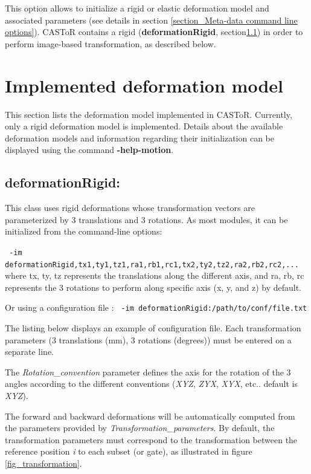 \documentclass[a4paper, 11pt]{article}
\begin{document}
This option allows to initialize a rigid or elastic deformation model and associated parameters (see details in section \ref{section_Meta-data command line options}). CASToR contains a rigid (\textbf{deformationRigid}, section\ref{ss_rigid}) in order to perform image-based transformation, as described below. 


\clearpage
\section{Implemented deformation model}
\label{s_implemented_model}

This section lists the deformation model implemented in CASToR. Currently, only a rigid deformation model is implemented. Details about the available deformation models and information regarding their initialization can be displayed using the command  \textbf{-help-motion}. 

\subsection{deformationRigid:}
\label{ss_rigid}

This class uses rigid deformations whose transformation vectors are parameterized by 3 translations and 3 rotations. As most modules, it can be initialized from the command-line options: 

\bigskip
\verb| -im deformationRigid,tx1,ty1,tz1,ra1,rb1,rc1,tx2,ty2,tz2,ra2,rb2,rc2,...| \\


where tx, ty, tz represents the translations along the different axis, and ra, rb, rc represents the 3 rotations to perform along specific axis (x, y, and z) by default.

\bigskip
Or using a configuration file :
\bigskip
\verb| -im deformationRigid:/path/to/conf/file.txt|
\bigskip

The listing below displays an example of configuration file. Each transformation parameters (3 translations (mm), 3 rotations (degrees)) must be entered on a separate line. 

The \textit{Rotation\_convention} parameter defines the axis for the rotation of the 3 angles according to the different conventions (\textit{XYZ}, \textit{ZYX}, \textit{XYX}, etc.. default is \textit{XYZ}). 

The forward and backward deformations will be automatically computed from the parameters provided by \textit{Transformation\_parameters}. By default, the transformation parameters must correspond to the transformation between the reference position \textit{i} to each subset (or gate), as illustrated in figure \ref{fig_transformation}. 
\end{document}
